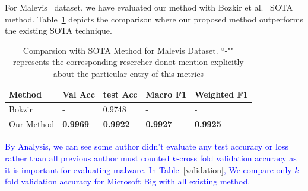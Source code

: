 \documentclass[pdflatex,sn-mathphys]{sn-jnl}%
\begin{document}
\color{blue}For Malevis~\cite{39} dataset, we have evaluated our method with Bozkir et al.~\cite{40} SOTA method. Table~\ref{comparsionmalevis} depicts the comparison where our proposed method outperforms the existing SOTA technique.
\color{black}
\begin{table}[!htb]
        \centering
		\caption{Comparsion with SOTA Method for Malevis Dataset. ``-"" represents the corresponding resercher donot mention explicitly about the particular entry of this metrics}
		\begin{tabular}{|p{2cm}||p{1.6cm}||p{1.6cm}||p{1.8cm}||p{2.1cm}|}
			\hline
			\textbf{Method} & \textbf{Val Acc} & \textbf{test Acc} & \textbf{Macro F1} & \textbf{Weighted F1} \\
			\hline
			Bokzir  &  - & 0.9748 & - &  - \\ 
			\hline
			Our Method & \textbf{0.9969} & \textbf{0.9922} & \textbf{0.9927}  & \textbf{0.9925}\\
			\hline
		\end{tabular}
		\label{comparsionmalevis}
      \end{table}
	 \color{black}

\par
\textcolor{blue}{By Analysis, we can see some author didn't evaluate any test accuracy or loss rather than all previous author must counted $k$-cross fold validation accuracy as it is important for evaluating malware. In Table~\ref{validation}, We compare only $k$-fold validation accuracy for Microsoft Big with all existing method.}
\end{document}
